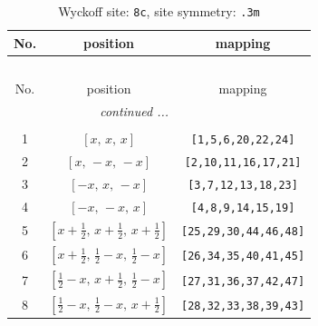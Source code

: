 \documentclass[fleqn,8pt]{jsarticle}
\begin{document}
\renewcommand{\arraystretch}{1.2}
\begin{longtable}{ccc}
\caption{Wyckoff site: {\tt 8c}, site symmetry: {\tt .3m}}
 \\
 \hline \hline
No. & position & mapping \\ \hline \endfirsthead

\multicolumn{2}{l}{\tablename\ \thetable{}} \\
 \hline \hline
No. & position & mapping \\ \hline \endhead

 \hline \hline
\multicolumn{2}{r}{\footnotesize\it continued ...} \\ \endfoot

 \hline \hline
\multicolumn{2}{r}{} \\ \endlastfoot

1 & $\left[ x,\, x,\, x \right]$ & {\tt [1,5,6,20,22,24]} \\ \hline
2 & $\left[ x,\, - x,\, - x \right]$ & {\tt [2,10,11,16,17,21]} \\ \hline
3 & $\left[ - x,\, x,\, - x \right]$ & {\tt [3,7,12,13,18,23]} \\ \hline
4 & $\left[ - x,\, - x,\, x \right]$ & {\tt [4,8,9,14,15,19]} \\ \hline
5 & $\left[ x + \frac{1}{2},\, x + \frac{1}{2},\, x + \frac{1}{2} \right]$ & {\tt [25,29,30,44,46,48]} \\ \hline
6 & $\left[ x + \frac{1}{2},\, \frac{1}{2} - x,\, \frac{1}{2} - x \right]$ & {\tt [26,34,35,40,41,45]} \\ \hline
7 & $\left[ \frac{1}{2} - x,\, x + \frac{1}{2},\, \frac{1}{2} - x \right]$ & {\tt [27,31,36,37,42,47]} \\ \hline
8 & $\left[ \frac{1}{2} - x,\, \frac{1}{2} - x,\, x + \frac{1}{2} \right]$ & {\tt [28,32,33,38,39,43]} \\
\end{longtable}
\renewcommand{\arraystretch}{1.2}
\end{document}
